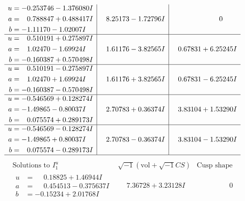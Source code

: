 \documentclass[1p]{elsarticle_modified}
\theoremstyle{definition}
\newcommand{\I}{\sqrt{-1}}
\begin{document}
$$\begin{array}{c|c|c}
\begin{aligned}
u &= -0.253746 - 1.376080 I \\
a &= \phantom{-}0.788847 + 0.488417 I \\
b &= -1.11170 - 1.02007 I\end{aligned}
 & \phantom{-}8.25173 - 1.72796 I & \phantom{-0.000000 } 0 \\ \hline\begin{aligned}
u &= \phantom{-}0.510191 + 0.275897 I \\
a &= \phantom{-}1.02470 - 1.69924 I \\
b &= -0.160387 + 0.570498 I\end{aligned}
 & \phantom{-}1.61176 - 3.82565 I & \phantom{-}0.67831 + 6.25245 I \\ \hline\begin{aligned}
u &= \phantom{-}0.510191 - 0.275897 I \\
a &= \phantom{-}1.02470 + 1.69924 I \\
b &= -0.160387 - 0.570498 I\end{aligned}
 & \phantom{-}1.61176 + 3.82565 I & \phantom{-}0.67831 - 6.25245 I \\ \hline\begin{aligned}
u &= -0.546569 + 0.128274 I \\
a &= -1.49865 - 0.80037 I \\
b &= \phantom{-}0.075574 + 0.289173 I\end{aligned}
 & \phantom{-}2.70783 + 0.36374 I & \phantom{-}3.83104 + 1.53290 I \\ \hline\begin{aligned}
u &= -0.546569 - 0.128274 I \\
a &= -1.49865 + 0.80037 I \\
b &= \phantom{-}0.075574 - 0.289173 I\end{aligned}
 & \phantom{-}2.70783 - 0.36374 I & \phantom{-}3.83104 - 1.53290 I\\
 \hline 
 \end{array}$$\newpage$$\begin{array}{c|c|c}  
\text{Solutions to }I^u_{1}& \I (\text{vol} + \sqrt{-1}CS) & \text{Cusp shape}\\
 \hline 
\begin{aligned}
u &= \phantom{-}0.18825 + 1.46944 I \\
a &= \phantom{-}0.454513 - 0.375637 I \\
b &= -0.15234 + 2.01768 I\end{aligned}
 & \phantom{-}7.36728 + 3.23128 I & \phantom{-0.000000 } 0 \\ \hline\begin{aligned}

\end{aligned}
\end{array}$$
\end{document}
